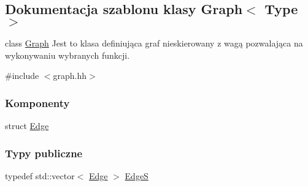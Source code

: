 \hypertarget{class_graph}{\subsection{Dokumentacja szablonu klasy Graph$<$ Type $>$}
\label{class_graph}
}


class \hyperlink{class_graph}{Graph} Jest to klasa definiująca graf nieskierowany z wagą pozwalająca na wykonywaniu wybranych funkcji.  




{\ttfamily \#include $<$graph.\-hh$>$}

\subsubsection*{Komponenty}
\begin{DoxyCompactItemize}
\item 
struct \hyperlink{struct_graph_1_1_edge}{Edge}
\end{DoxyCompactItemize}
\subsubsection*{Typy publiczne}
\begin{DoxyCompactItemize}
\item 
typedef std\-::vector$<$ \hyperlink{struct_graph_1_1_edge}{Edge} $>$ \hyperlink{class_graph_a48cb28a87e5956064f989ae80caf3f06}{Edge\-S}
\end{DoxyCompactItemize}
